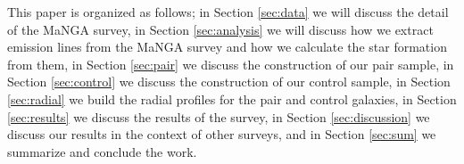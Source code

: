 \documentclass[iop,revtex4,twocolumn,apj,numberedappendix,appendixfloats]{emulateapj}
\begin{document}








This paper is organized as follows; in Section \ref{sec:data} we will discuss the detail of the MaNGA survey, in Section \ref{sec:analysis} we will discuss how we extract emission lines from the MaNGA survey and how we calculate the star formation from them, in Section \ref{sec:pair} we discuss the construction of our pair sample, in Section \ref{sec:control} we discuss the construction of our control sample, in Section \ref{sec:radial} we build the radial profiles for the pair and control galaxies, in Section \ref{sec:results} we discuss the results of the survey, in Section \ref{sec:discussion} we discuss our results in the context of other surveys, and in Section \ref{sec:sum} we summarize and conclude the work. 
\end{document}
